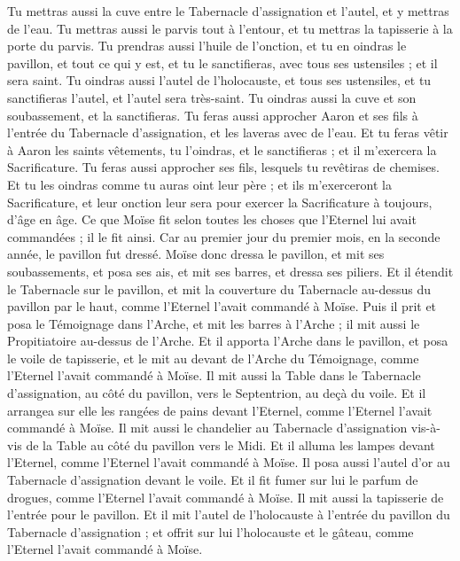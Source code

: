 \begin{multicols}{2}
Tu mettras aussi la cuve entre le Tabernacle d'assignation et l'autel, et y mettras de l'eau.
Tu mettras aussi le parvis tout à l’entour, et tu mettras la tapisserie à la porte du parvis.
Tu prendras aussi l'huile de l'onction, et tu en oindras le pavillon, et tout ce qui y est, et tu le sanctifieras, avec tous ses ustensiles ; et il sera saint.
Tu oindras aussi l'autel de l'holocauste, et tous ses ustensiles, et tu sanctifieras l'autel, et l'autel sera très-saint.
Tu oindras aussi la cuve et son soubassement, et la sanctifieras.
Tu feras aussi approcher Aaron et ses fils à l'entrée du Tabernacle d'assignation, et les laveras avec de l'eau.
Et tu feras vêtir à Aaron les saints vêtements, tu l'oindras, et le sanctifieras ; et il m'exercera la Sacrificature.
Tu feras aussi approcher ses fils, lesquels tu revêtiras de chemises.
Et tu les oindras comme tu auras oint leur père ; et ils m'exerceront la Sacrificature, et leur onction leur sera pour exercer la Sacrificature à toujours, d'âge en âge.
Ce que Moïse fit selon toutes les choses que l'Eternel lui avait commandées ; il le fit ainsi.
Car au premier jour du premier mois, en la seconde année, le pavillon fut dressé.
Moïse donc dressa le pavillon, et mit ses soubassements, et posa ses ais, et mit ses barres, et dressa ses piliers.
Et il étendit le Tabernacle sur le pavillon, et mit la couverture du Tabernacle au-dessus du pavillon par le haut, comme l'Eternel l'avait commandé à Moïse.
Puis il prit et posa le Témoignage dans l'Arche, et mit les barres à l'Arche ; il mit aussi le Propitiatoire au-dessus de l'Arche.
Et il apporta l'Arche dans le pavillon, et posa le voile de tapisserie, et le mit au devant de l'Arche du Témoignage, comme l'Eternel l'avait commandé à Moïse.
Il mit aussi la Table dans le Tabernacle d'assignation, au côté du pavillon, vers le Septentrion, au deçà du voile.
Et il arrangea sur elle les rangées de pains devant l'Eternel, comme l'Eternel l'avait commandé à Moïse.
Il mit aussi le chandelier au Tabernacle d'assignation vis-à-vis de la Table au côté du pavillon vers le Midi.
Et il alluma les lampes devant l'Eternel, comme l'Eternel l'avait commandé à Moïse.
Il posa aussi l'autel d'or au Tabernacle d'assignation devant le voile.
Et il fit fumer sur lui le parfum de drogues, comme l'Eternel l'avait commandé à Moïse.
Il mit aussi la tapisserie de l'entrée pour le pavillon.
Et il mit l'autel de l'holocauste à l'entrée du pavillon du Tabernacle d'assignation ; et offrit sur lui l'holocauste et le gâteau, comme l'Eternel l'avait commandé à Moïse.

\end{multicols}
